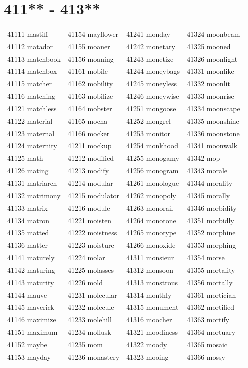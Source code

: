 \documentclass[10pt, oneside]{book}
\begin{document}
\begin{table}
	\centering
	\section*{411** - 413**}
	\begin{tabular}{l l l l}
41111 mastiff &41154 mayflower &41241 monday &41324 moonbeam\\
41112 matador &41155 moaner &41242 monetary &41325 mooned\\
41113 matchbook &41156 moaning &41243 monetize &41326 moonlight\\
41114 matchbox &41161 mobile &41244 moneybags &41331 moonlike\\
41115 matcher &41162 mobility &41245 moneyless &41332 moonlit\\
41116 matching &41163 mobilize &41246 moneywise &41333 moonrise\\
41121 matchless &41164 mobster &41251 mongoose &41334 moonscape\\
41122 material &41165 mocha &41252 mongrel &41335 moonshine\\
41123 maternal &41166 mocker &41253 monitor &41336 moonstone\\
41124 maternity &41211 mockup &41254 monkhood &41341 moonwalk\\
41125 math &41212 modified &41255 monogamy &41342 mop\\
41126 mating &41213 modify &41256 monogram &41343 morale\\
41131 matriarch &41214 modular &41261 monologue &41344 morality\\
41132 matrimony &41215 modulator &41262 monopoly &41345 morally\\
41133 matrix &41216 module &41263 monorail &41346 morbidity\\
41134 matron &41221 moisten &41264 monotone &41351 morbidly\\
41135 matted &41222 moistness &41265 monotype &41352 morphine\\
41136 matter &41223 moisture &41266 monoxide &41353 morphing\\
41141 maturely &41224 molar &41311 monsieur &41354 morse\\
41142 maturing &41225 molasses &41312 monsoon &41355 mortality\\
41143 maturity &41226 mold &41313 monstrous &41356 mortally\\
41144 mauve &41231 molecular &41314 monthly &41361 mortician\\
41145 maverick &41232 molecule &41315 monument &41362 mortified\\
41146 maximize &41233 molehill &41316 moocher &41363 mortify\\
41151 maximum &41234 mollusk &41321 moodiness &41364 mortuary\\
41152 maybe &41235 mom &41322 moody &41365 mosaic\\
41153 mayday &41236 monastery &41323 mooing &41366 mossy\\
	\end{tabular}
 \end{table}
\clearpage
\end{document}
